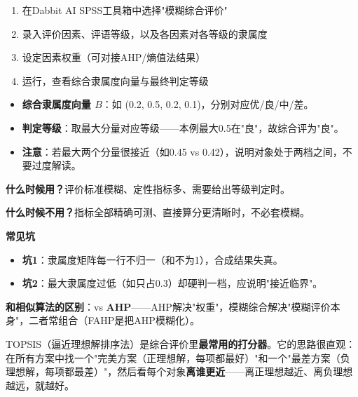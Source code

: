 \begin{algosposs}
\begin{enumerate}
    \item 在Dabbit AI SPSS工具箱中选择"模糊综合评价"
    \item 录入评价因素、评语等级，以及各因素对各等级的隶属度
    \item 设定因素权重（可对接AHP/熵值法结果）
    \item 运行，查看综合隶属度向量与最终判定等级
\end{enumerate}
\end{algosposs}

\begin{algoresult}
\begin{itemize}
    \item \textbf{综合隶属度向量 $B$}：如 (0.2, 0.5, 0.2, 0.1)，分别对应优/良/中/差。
    \item \textbf{判定等级}：取最大分量对应等级——本例最大0.5在"良"，故综合评为"良"。
    \item \textbf{注意}：若最大两个分量很接近（如0.45 vs 0.42），说明对象处于两档之间，不要过度解读。
\end{itemize}
\end{algoresult}

\begin{algonotes}
\textbf{什么时候用？}评价标准模糊、定性指标多、需要给出等级判定时。

\textbf{什么时候不用？}指标全部精确可测、直接算分更清晰时，不必套模糊。

\textbf{常见坑}
\begin{itemize}
    \item \textbf{坑1}：隶属度矩阵每一行不归一（和不为1），合成结果失真。
    \item \textbf{坑2}：最大隶属度过低（如只占0.3）却硬判一档，应说明"接近临界"。
\end{itemize}

\textbf{和相似算法的区别}：vs \textbf{AHP}——AHP解决"权重"，模糊综合解决"模糊评价本身"，二者常组合（FAHP是把AHP模糊化）。
\end{algonotes}


\begin{algointro}
TOPSIS（逼近理想解排序法）是综合评价里\textbf{最常用的打分器}。它的思路很直观：在所有方案中找一个"完美方案（正理想解，每项都最好）"和一个"最差方案（负理想解，每项都最差）"，然后看每个对象\textbf{离谁更近}——离正理想越近、离负理想越远，就越好。
\end{algointro}

